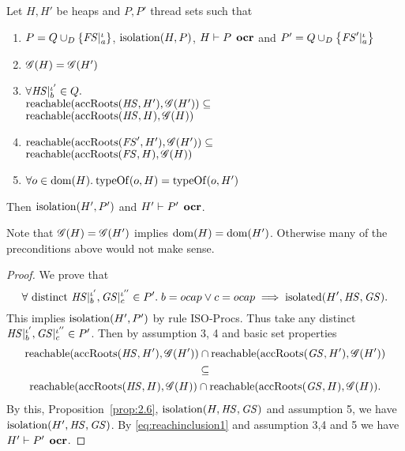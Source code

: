 \begin{proposition} \label{prop:2.11}
  Let $H, H'$ be heaps and $P, P'$ thread sets such that
  \begin{enumerate}
    \item $P = Q \cup_D \left\{ \mathit{FS}|_a^\iota \right\}$, $\mbox{$\mathrm{isolation}$}{(H, P)}$, $H
      \vdash P \:\: \mbox{\bf ocr}$ and $P' = Q \cup_D \left\{ \mathit{FS}'|_a^\iota \right\}$
    \item $\mathscr{G}{(H)} = \mathscr{G}{(H')}$
    \item $\forall \mathit{HS}|_b^{\iota'} \in Q.$ \\ 
      $\mbox{$\mathrm{reachable}$}{(\mbox{$\mathrm{accRoots}$}{(\ensuremath{\mathit{HS}}, H')}, \ensuremath{\mathscr{G}}{(H')})} \subseteq$ \\
      $\mbox{$\mathrm{reachable}$}{(\mbox{$\mathrm{accRoots}$}{(\ensuremath{\mathit{HS}}, H)}, \ensuremath{\mathscr{G}}{(H)})}$
    \item $\mbox{$\mathrm{reachable}$}{(\mbox{$\mathrm{accRoots}$}{(\ensuremath{\mathit{FS}}', H')}, \ensuremath{\mathscr{G}}{(H')})} \subseteq$ \\
      $\mbox{$\mathrm{reachable}$}{(\mbox{$\mathrm{accRoots}$}{(\ensuremath{\mathit{FS}}, H)}, \ensuremath{\mathscr{G}}{(H)})}$
    \item $\forall o \in \mbox{$\mathrm{dom}$}{(H)}. \: \mbox{$\mathrm{typeOf}$}{(o, H)} = \mbox{$\mathrm{typeOf}$}{(o, H')}$
  \end{enumerate}
  Then $\mbox{$\mathrm{isolation}$}{(H', P')}$ and $H' \vdash P' \:\: \mbox{\bf ocr}$.
\end{proposition}

\begin{remark}
  Note that $\mathscr{G}{(H)} = \mathscr{G}{(H')}$ implies $\mbox{$\mathrm{dom}$}{(H)} = \mbox{$\mathrm{dom}$}{(H')}$.
  Otherwise many of the preconditions above would not make sense.
\end{remark}

\begin{proof}
  We prove that 
  \begin{equation*}
    \forall \text{ distinct } \mathit{HS}|_b^{\iota'}, \mathit{GS}|_c^{\iota''} \in P'.\; b = \mbox{$ocap$} \lor c = \mbox{$ocap$} \implies
    \mbox{$\mathrm{isolated}$}(H', \mathit{HS}, \mathit{GS}).
  \end{equation*}
  This implies $\mbox{$\mathrm{isolation}$}(H', P')$ by rule {\sc ISO-Procs}.
  Thus take any distinct $\mathit{HS}|_b^{\iota'}, \mathit{GS}|_c^{\iota''} \in P'$. Then by assumption 3, 4 and basic set
  properties
  \begin{equation} \label{eq:reachinclusion1}
    \begin{gathered}
      \mbox{$\mathrm{reachable}$}(\mbox{$\mathrm{accRoots}$}(\mathit{HS}, H'), \mathscr{G}(H')) \cap \mbox{$\mathrm{reachable}$}(\mbox{$\mathrm{accRoots}$}(\mathit{GS}, H'),
      \mathscr{G}(H')) \\
      \subseteq \\
      \mbox{$\mathrm{reachable}$}(\mbox{$\mathrm{accRoots}$}(\mathit{HS}, H), \mathscr{G}(H)) \cap \mbox{$\mathrm{reachable}$}(\mbox{$\mathrm{accRoots}$}(\mathit{GS}, H),
      \mathscr{G}(H)).
    \end{gathered}
  \end{equation}
  By this, Proposition~\ref{prop:2.6}, $\mbox{$\mathrm{isolation}$}(H, \mathit{HS}, \mathit{GS})$ and assumption 5, we have
  $\mbox{$\mathrm{isolation}$}(H', \mathit{HS}, \mathit{GS})$. By \eqref{eq:reachinclusion1} and assumption 3,4 and 5
  we have $H' \vdash P' \:\: \mbox{\bf ocr}$.
\end{proof}

